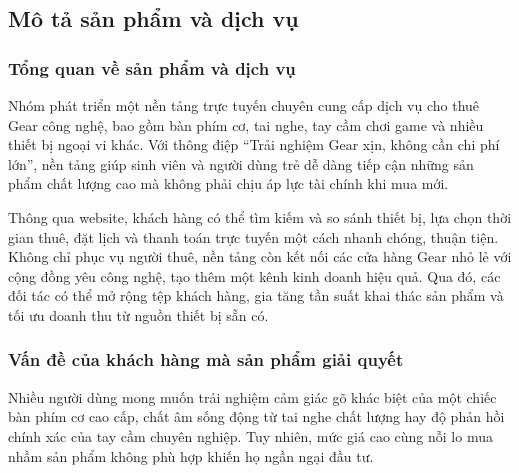 


\subsection{Mô tả sản phẩm và dịch vụ}

\subsubsection{Tổng quan về sản phẩm và dịch vụ}
    Nhóm phát triển một nền tảng trực tuyến chuyên cung cấp dịch vụ cho thuê Gear công nghệ, bao gồm bàn phím cơ, tai nghe, tay cầm chơi game và nhiều thiết bị ngoại vi khác. Với thông điệp ``Trải nghiệm Gear xịn, không cần chi phí lớn'', nền tảng giúp sinh viên và người dùng trẻ dễ dàng tiếp cận những sản phẩm chất lượng cao mà không phải chịu áp lực tài chính khi mua mới.

    Thông qua website, khách hàng có thể tìm kiếm và so sánh thiết bị, lựa chọn thời gian thuê, đặt lịch và thanh toán trực tuyến một cách nhanh chóng, thuận tiện. Không chỉ phục vụ người thuê, nền tảng còn kết nối các cửa hàng Gear nhỏ lẻ với cộng đồng yêu công nghệ, tạo thêm một kênh kinh doanh hiệu quả. Qua đó, các đối tác có thể mở rộng tệp khách hàng, gia tăng tần suất khai thác sản phẩm và tối ưu doanh thu từ nguồn thiết bị sẵn có.

\subsubsection{Vấn đề của khách hàng mà sản phẩm giải quyết}
    Nhiều người dùng mong muốn trải nghiệm cảm giác gõ khác biệt của một chiếc bàn phím cơ cao cấp, chất âm sống động từ tai nghe chất lượng hay độ phản hồi chính xác của tay cầm chuyên nghiệp. Tuy nhiên, mức giá cao cùng nỗi lo mua nhầm sản phẩm không phù hợp khiến họ ngần ngại đầu tư.

